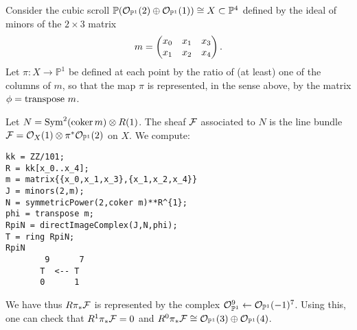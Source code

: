 \documentclass[twoside,12pt, leqno]{amsart}
\def\PP{{\mathbb P}}
\def\P{{\mathbb P}}
\def\fix#1{{\bf ***Fix:} #1 {\bf ***}}
\begin{document}
\begin{example}
Consider the cubic scroll 
$\PP(\sO_{\PP^1}(2) \oplus \sO_{\PP^1}(1))\cong X\subset \PP^4
$ 
defined by the ideal of minors of the $2\times 3$ matrix
$$
m=\begin{pmatrix}
x_0& x_1 & x_3 \cr
x_1 & x_2 & x_4 \cr
\end{pmatrix}   .
$$
Let $\pi :X \to \PP^1$ be defined at each point by the ratio of (at least) one of 
the columns of $m$, so that the map $\pi$ is represented, in the sense above,
by the matrix $\phi = {\rm transpose}\ m$. 

Let $N=\operatorname{Sym}^2({\rm{coker}\,} m)\otimes R(1)$.  The sheaf ${\mathcal F}$ associated to $N$ is the line bundle $\sF = \sO_X(1)\otimes \pi^*\sO_{\PP^1}(2)$ on $X$.  We compute:
{\small\begin{verbatim}
kk = ZZ/101;
R = kk[x_0..x_4];
m = matrix{{x_0,x_1,x_3},{x_1,x_2,x_4}}
J = minors(2,m);
N = symmetricPower(2,coker m)**R^{1};
phi = transpose m;
RpiN = directImageComplex(J,N,phi);
T = ring RpiN;
RpiN
        9      7
       T  <-- T               
       0      1
\end{verbatim}    }   
\noindent We have thus $R\pi_*{\mathcal F}$ is represented by the complex $\cO_{\PP^1}^9\gets \cO_{\PP^1}(-1)^7$.  Using this, one can check that $R^1\pi_*{\mathcal F}=0$ and $R^0\pi_*\sF\cong  \sO_{\PP^1}(3) \oplus \sO_{\PP^1}(4)$.
\end{example}
%
%
\end{document}
